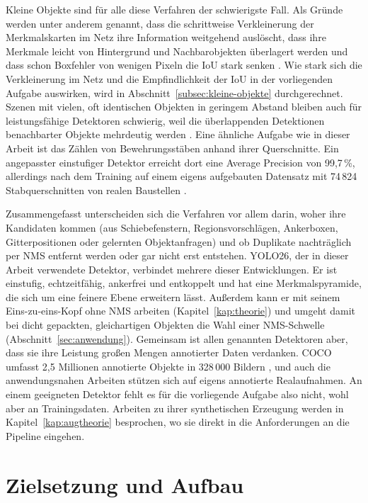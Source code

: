  Kleine Objekte sind für alle diese
Verfahren der schwierigste Fall. Als Gründe werden unter anderem genannt, dass
die schrittweise Verkleinerung der Merkmalskarten im Netz ihre Information
weitgehend auslöscht, dass ihre Merkmale leicht von Hintergrund und
Nachbarobjekten überlagert werden und dass schon Boxfehler von wenigen Pixeln
die IoU stark senken \parencite{cheng2023small}. Wie stark sich die
Verkleinerung im Netz und die Empfindlichkeit der IoU in der vorliegenden
Aufgabe auswirken, wird in Abschnitt~\ref{subsec:kleine-objekte} durchgerechnet.
Szenen mit vielen, oft identischen Objekten in geringem Abstand bleiben auch
für leistungsfähige Detektoren schwierig, weil die überlappenden Detektionen
benachbarter Objekte mehrdeutig werden \parencite{goldman2019}. Eine ähnliche
Aufgabe wie in dieser Arbeit ist das Zählen von Bewehrungsstäben anhand ihrer
Querschnitte. Ein angepasster einstufiger Detektor erreicht dort eine Average
Precision von 99,7\,\%, allerdings nach dem Training auf einem eigens
aufgebauten Datensatz mit 74\,824 Stabquerschnitten von realen Baustellen
\parencite{li2021rebar}.

 Zusammengefasst unterscheiden sich die Verfahren vor allem
darin, woher ihre Kandidaten kommen (aus Schiebefenstern, Regionsvorschlägen,
Ankerboxen, Gitterpositionen oder gelernten Objektanfragen) und ob Duplikate
nachträglich per NMS entfernt werden oder gar nicht erst entstehen. YOLO26, der
in dieser Arbeit verwendete Detektor, verbindet mehrere dieser Entwicklungen.
Er ist einstufig, echtzeitfähig, ankerfrei und entkoppelt und hat eine
Merkmalspyramide, die sich um eine feinere Ebene erweitern lässt. Außerdem kann
er mit seinem Eins-zu-eins-Kopf ohne NMS arbeiten (Kapitel~\ref{kap:theorie})
und umgeht damit bei dicht gepackten, gleichartigen Objekten die Wahl einer
NMS-Schwelle (Abschnitt~\ref{sec:anwendung}). Gemeinsam ist allen genannten Detektoren
aber, dass sie ihre Leistung großen Mengen annotierter Daten verdanken. COCO
umfasst 2,5 Millionen annotierte Objekte in 328\,000 Bildern
\parencite{lin2014coco}, und auch die anwendungsnahen Arbeiten stützen sich auf
eigens annotierte Realaufnahmen. An einem geeigneten Detektor fehlt es für die
vorliegende Aufgabe also nicht, wohl aber an Trainingsdaten. Arbeiten zu ihrer
synthetischen Erzeugung werden in Kapitel~\ref{kap:augtheorie} besprochen, wo
sie direkt in die Anforderungen an die Pipeline eingehen.

\section{Zielsetzung und Aufbau}

